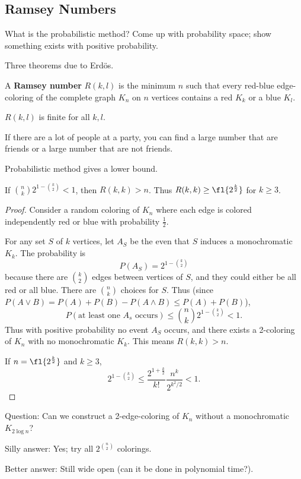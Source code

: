 
\subsection{Ramsey Numbers}
What is the probabilistic method? Come up with probability space; show something exists with positive probability.

Three theorems due to Erd\"os.
\begin{df}
A \textbf{Ramsey number} $R(k,l)$ is the minimum $n$ such that every red-blue edge-coloring of the complete graph $K_n$ on $n$ vertices contains a red $K_k$ or a blue $K_l$. 
\end{df}

\begin{thm}
$R(k,l)$ is finite for all $k,l$.
\end{thm}
If there are a lot of people at a party, you can find a large number that are friends or a large number that are not friends.

Probabilistic method gives a lower bound.
\begin{pr}
If $\binom nk2^{1-\binom k2}<1$, then $R(k,k)>n$. Thus $R(k,k)\geq \fl{2^{\frac k2}}$ for $k\geq 3$.
\end{pr}
\begin{proof}
Consider a random coloring of $K_n$ where each edge is colored independently red or blue with probability $\frac 12$. 

For any set $S$ of $k$ vertices, let $A_S$ be the even that $S$ induces a monochromatic $K_k$. The probability is
\[P(A_S)=2^{1-\binom k2}\]
because there are $\binom k2$ edges between vertices of $S$, and they could either be all red or all blue. 
There are $\binom nk$ choices for $S$. Thus (since $P(A\vee B)=P(A)+P(B)-P(A\wedge B)\leq P(A)+P(B)$),
\[P(\text{at least one }A_s\text{ occurs})\leq \binom nk 2^{1-\binom k2}<1.\]
Thus with positive probability no event $A_S$ occurs, and there exists a 2-coloring of $K_n$ with no monochromatic $K_k$. This means $R(k,k)>n$. 

If $n=\fl{2^{\frac k2}}$ and $k\geq 3$,
\[2^{1-\binom k2}\leq \frac{2^{1+\frac k2}}{k!} \frac{n^k}{2^{k^2/2}}<1.\]
\end{proof}

Question: Can we construct a 2-edge-coloring of $K_n$ without a monochromatic $K_{2\log n}$?

Silly answer: Yes; try all $2^{\binom n2}$ colorings.

Better answer: Still wide open (can it be done in polynomial time?).

